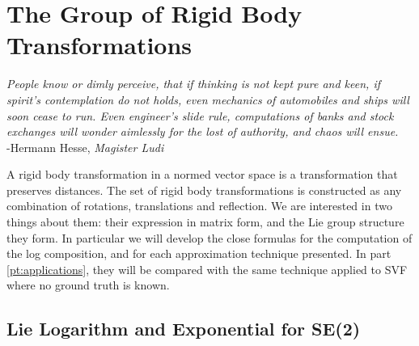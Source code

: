 
\chapter{The Group of Rigid Body Transformations}\label{ch:rigid_body_transformations}

\begin{flushright}
	\emph{People know or dimly perceive, that if thinking is not kept pure and keen, if spirit's contemplation do not holds, even mechanics of automobiles and ships will soon cease to run. Even engineer's slide rule, computations of banks and stock exchanges will wonder aimlessly for the lost of authority, and chaos will ensue.} \\ -Hermann Hesse, \emph{Magister Ludi}
\end{flushright}


A rigid body transformation in a normed vector space is a transformation that preserves distances. The set of rigid body transformations is constructed as any combination of rotations, translations and reflection. We are interested in two things about them: their expression in matrix form, and the Lie group structure they form. In particular we will develop the close formulas for the computation of the log composition, and for each approximation technique presented. In part \ref{pt:applications}, they will be compared with the same technique applied to SVF where no ground truth is known.

\section{Lie Logarithm and Exponential for SE(2)}

